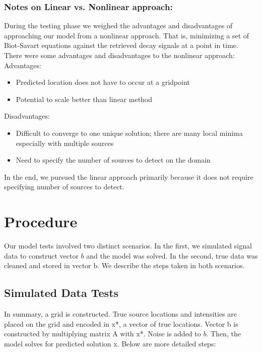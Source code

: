 \documentclass[a4paper]{article}
\begin{document}
\subsubsection*{Notes on Linear vs. Nonlinear approach:}

During the testing phase we weighed the advantages and disadvantages of approaching our model from a nonlinear approach. That is, minimizing a set of Biot-Savart equations against the retrieved decay signals at a point in time. There were some advantages and disadvantages to the nonlinear approach:\\

\noindent Advantages:
\begin{itemize}
\item Predicted location does not have to occur at a gridpoint
\item Potential to scale better than linear method
\end{itemize}
Disadvantages:
\begin{itemize}
\item Difficult to converge to one unique solution; there are many local minima especially with multiple sources
\item Need to specify the number of sources to detect on the domain
\end{itemize}

In the end, we pursued the linear approach primarily because it does not require specifying number of sources to detect.

\section{Procedure}

Our model tests involved two distinct scenarios. In the first, we simulated signal data to construct vector $b$ and the model was solved. In the second, true data was cleaned and stored in vector b. We describe the steps taken in both scenarios.

\subsection{Simulated Data Tests}

In summary, a grid is constructed. True source locations and intensities are placed on the grid and encoded in x*, a vector of true locations. Vector b is constructed by multiplying matrix A with x*. Noise is added to $b$. Then, the model solves for predicted solution x. Below are more detailed steps:
\end{document}
